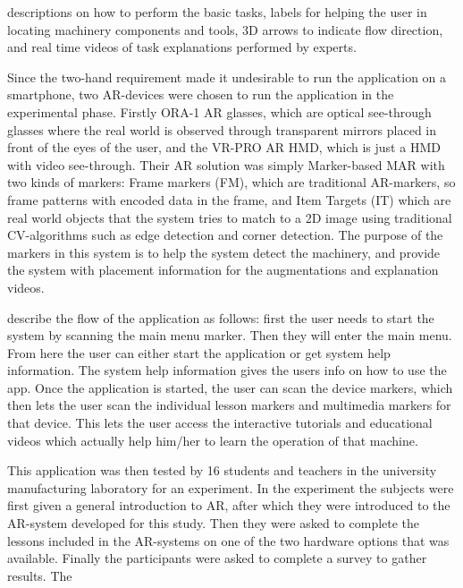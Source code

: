 descriptions on how to perform the basic tasks, labels for helping the user 
in locating machinery components and tools, 3D arrows to indicate flow 
direction, and real time videos of task explanations performed by 
experts.\cite{reyesEtAl2016}\par
	Since the two-hand requirement made it undesirable to run the 
application on a smartphone, two AR-devices were chosen to run the 
application in the experimental phase. Firstly ORA-1 AR glasses, which are 
optical see-through glasses where the real world is observed through 
transparent mirrors placed in front of the eyes of the user, and the VR-PRO 
AR HMD, which is just a HMD with video see-through.\cite{reyesEtAl2016} Their 
AR solution was simply Marker-based MAR with two kinds of markers: Frame 
markers (FM), which are traditional AR-markers, so frame patterns with encoded 
data in the frame, and Item Targets (IT) which are real world objects that 
the system tries to match to a 2D image using traditional CV-algorithms such 
as edge detection and corner detection.\cite{reyesEtAl2016} The purpose of the 
markers in this system is to help the system detect the machinery, and 
provide the system with placement information for the augmentations and 
explanation videos.\cite{reyesEtAl2016}\par
	\textcite{reyesEtAl2016} describe the flow of the application as 
follows: first the user needs to start the system by scanning the main menu 
marker. Then they will enter the main menu. From here the user can either 
start the application or get system help information. The system help 
information gives the users info on how to use the app. Once the application 
is started, the user can scan the device markers, which then lets the user 
scan the individual lesson markers and multimedia markers for that device. 
This lets the user access the interactive tutorials and educational videos 
which actually help him/her to learn the operation of that 
machine.\cite{reyesEtAl2016}\par
	This application was then tested by 16 students and teachers in the 
university manufacturing laboratory for an experiment.\cite{reyesEtAl2016} In 
the experiment the subjects were first given a general introduction to AR, 
after which they were introduced to the AR-system developed for this study. 
Then they were asked to complete the lessons included in the AR-systems on 
one of the two hardware options that was available. Finally the participants 
were asked to complete a survey to gather results.\cite{reyesEtAl2016} The 
